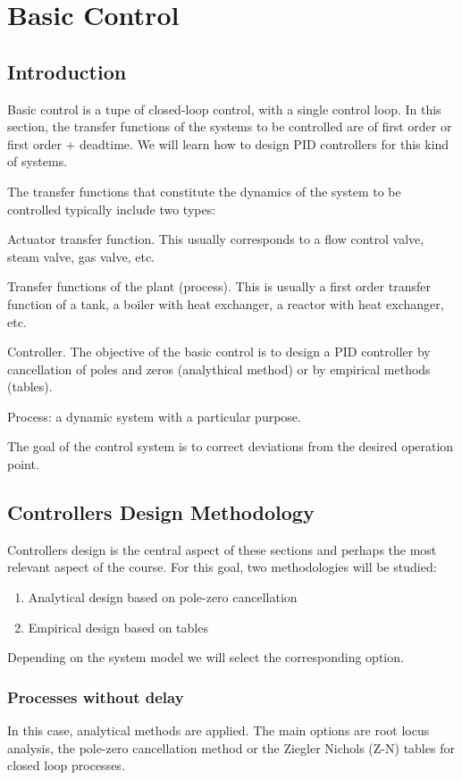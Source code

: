 \chapter{Basic Control}
\section{Introduction}
Basic control is a tupe of closed-loop control, with a single control loop. In this section, the transfer functions of the systems to be controlled are of first order or first order + deadtime. We will learn how to design PID controllers for this kind of systems.

The transfer functions that constitute the dynamics of the system to be controlled typically include two types:

Actuator transfer function. This usually corresponds to a flow control valve, steam valve, gas valve, etc.

Transfer functions of the plant (process). This is usually a first order transfer function of a tank, a boiler with heat exchanger, a reactor with heat exchanger, etc.

Controller. The objective of the basic control is to design a PID controller by cancellation of poles and zeros (analythical method) or by empirical methods (tables).

Process: a dynamic system with a particular purpose.

The goal of the control system is to correct deviations from the desired operation point.

\section{Controllers Design Methodology}
Controllers design is the central aspect of these sections and perhaps the most relevant aspect of the course. For this goal, two methodologies will be studied:
\begin{enumerate}
    \item Analytical design based on pole-zero cancellation
    \item Empirical design based on tables
\end{enumerate}
Depending on the system model we will select the corresponding option.

\subsection{Processes without delay}
In this case, analytical methods are applied. The main options are root locus analysis, the pole-zero cancellation method or the Ziegler Nichols (Z-N) tables for closed loop processes.

